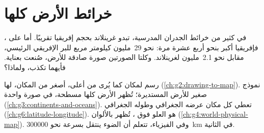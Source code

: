 \chapter{خرائط الأرض كلها}\label{ch:g9:maps-of-the-earth}

في كثير من خرائط الجدران المدرسية، تبدو غرينلاند بحجم إفريقيا تقريبًا.
أما على ، فإفريقيا أكبر بنحو أربع عشرة مرة: نحو
29~مليون كيلومتر مربع للبر الإفريقي الرئيسي، مقابل نحو 2.1~مليون
لغرينلاند. وكلتا الصورتين صورة صادقة للأرض، صُنعت بعناية. فأيهما تكذب،
ولماذا؟

\begin{recall}
 رسم لمكان كما يُرى من أعلى، أصغر من المكان، لها   (\cref{ch:g2:drawing-to-map}).  نموذج صغير للأرض
المستديرة؛  تُظهر الأرض كلها مسطحة، في صورة واحدة
(\cref{ch:g3:continents-and-oceans}).   تعطي كل
مكان عرضه الجغرافي وطوله الجغرافي (\cref{ch:g6:latitude-longitude}).
 هو العلو فوق ،  تُظهر 
بالألوان (\cref{ch:g4:world-physical-map}). وفي الفيزياء، تتعلم أن الضوء
ينتقل بسرعة نحو \qty{300000}{km} في الثانية.
\end{recall}

